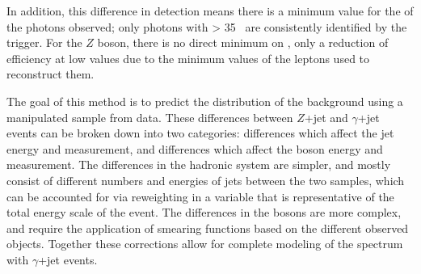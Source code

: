 In addition, this difference in detection means there is a minimum value for the \pt of the photons observed; only photons with \pt > 35 \gev~are consistently identified by the trigger. For the $Z$ boson, there is no direct minimum on \pt, only a reduction of efficiency at low values due to the minimum \pt values of the leptons used to reconstruct them. 

The goal of this method is to predict the \met distribution of the \dyjets background using a manipulated \gjets sample from data. These differences between $Z$+jet and $\gamma$+jet events can be broken down into two categories: differences which affect the jet energy and measurement, and differences which affect the boson energy and measurement. The differences in the hadronic system are simpler, and mostly consist of different numbers and energies of jets between the two samples, which can be accounted for via reweighting in a variable that is representative of the total energy scale of the event. The differences in the bosons are more complex, and require the application of smearing functions based on the different observed objects. Together these corrections allow for complete modeling of the \dyjets \met spectrum with $\gamma$+jet events.


